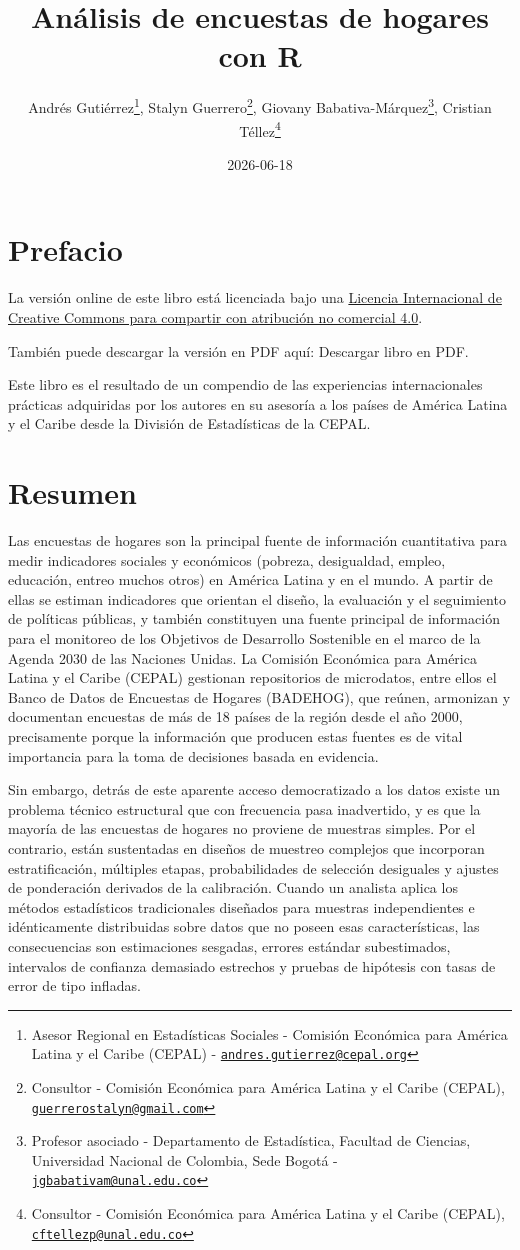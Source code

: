 \documentclass[
  spanish,
  12pt,
]{book}
\title{Análisis de encuestas de hogares con R}
\author{Andrés Gutiérrez\footnote{Asesor Regional en Estadísticas Sociales - Comisión Económica para América Latina y el Caribe (CEPAL) - \href{mailto:andres.gutierrez@cepal.org}{\nolinkurl{andres.gutierrez@cepal.org}}}, Stalyn Guerrero\footnote{Consultor - Comisión Económica para América Latina y el Caribe (CEPAL), \href{mailto:guerrerostalyn@gmail.com}{\nolinkurl{guerrerostalyn@gmail.com}}}, Giovany Babativa-Márquez\footnote{Profesor asociado - Departamento de Estadística, Facultad de Ciencias, Universidad Nacional de Colombia, Sede Bogotá - \href{mailto:jgbabativam@unal.edu.co}{\nolinkurl{jgbabativam@unal.edu.co}}}, Cristian Téllez\footnote{Consultor - Comisión Económica para América Latina y el Caribe (CEPAL), \href{mailto:cftellezp@unal.edu.co}{\nolinkurl{cftellezp@unal.edu.co}}}}
\date{2026-06-18}
\begin{document}
\maketitle

\renewcommand*\contentsname{Tabla de Contenido}
{
\setcounter{tocdepth}{1}
\tableofcontents
}
\listoffigures
\listoftables
\chapter*{Prefacio}\label{prefacio}

La versión online de este libro está licenciada bajo una \href{http://creativecommons.org/licenses/by-nc-sa/4.0/}{Licencia Internacional de Creative Commons para compartir con atribución no comercial 4.0}.

También puede descargar la versión en PDF aquí:
Descargar libro en PDF.

Este libro es el resultado de un compendio de las experiencias internacionales prácticas adquiridas por los autores en su asesoría a los países de América Latina y el Caribe desde la División de Estadísticas de la CEPAL.

\chapter*{Resumen}\label{resumen}

Las encuestas de hogares son la principal fuente de información cuantitativa para medir indicadores sociales y económicos (pobreza, desigualdad, empleo, educación, entreo muchos otros) en América Latina y en el mundo. A partir de ellas se estiman indicadores que orientan el diseño, la evaluación y el seguimiento de políticas públicas, y también constituyen una fuente principal de información para el monitoreo de los Objetivos de Desarrollo Sostenible en el marco de la Agenda 2030 de las Naciones Unidas. La Comisión Económica para América Latina y el Caribe (CEPAL) gestionan repositorios de microdatos, entre ellos el Banco de Datos de Encuestas de Hogares (BADEHOG), que reúnen, armonizan y documentan encuestas de más de 18 países de la región desde el año 2000, precisamente porque la información que producen estas fuentes es de vital importancia para la toma de decisiones basada en evidencia.

Sin embargo, detrás de este aparente acceso democratizado a los datos existe un problema técnico estructural que con frecuencia pasa inadvertido, y es que la mayoría de las encuestas de hogares no proviene de muestras simples. Por el contrario, están sustentadas en diseños de muestreo complejos que incorporan estratificación, múltiples etapas, probabilidades de selección desiguales y ajustes de ponderación derivados de la calibración. Cuando un analista aplica los métodos estadísticos tradicionales diseñados para muestras independientes e idénticamente distribuidas sobre datos que no poseen esas características, las consecuencias son estimaciones sesgadas, errores estándar subestimados, intervalos de confianza demasiado estrechos y pruebas de hipótesis con tasas de error de tipo infladas.
\end{document}
